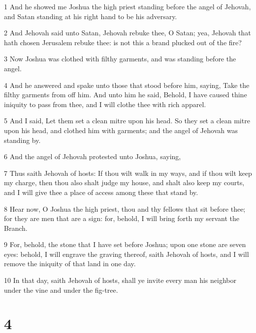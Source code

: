 \par 1 And he showed me Joshua the high priest standing before the angel of Jehovah, and Satan standing at his right hand to be his adversary.
\par 2 And Jehovah said unto Satan, Jehovah rebuke thee, O Satan; yea, Jehovah that hath chosen Jerusalem rebuke thee: is not this a brand plucked out of the fire?
\par 3 Now Joshua was clothed with filthy garments, and was standing before the angel.
\par 4 And he answered and spake unto those that stood before him, saying, Take the filthy garments from off him. And unto him he said, Behold, I have caused thine iniquity to pass from thee, and I will clothe thee with rich apparel.
\par 5 And I said, Let them set a clean mitre upon his head. So they set a clean mitre upon his head, and clothed him with garments; and the angel of Jehovah was standing by.
\par 6 And the angel of Jehovah protested unto Joshua, saying,
\par 7 Thus saith Jehovah of hosts: If thou wilt walk in my ways, and if thou wilt keep my charge, then thou also shalt judge my house, and shalt also keep my courts, and I will give thee a place of access among these that stand by.
\par 8 Hear now, O Joshua the high priest, thou and thy fellows that sit before thee; for they are men that are a sign: for, behold, I will bring forth my servant the Branch.
\par 9 For, behold, the stone that I have set before Joshua; upon one stone are seven eyes: behold, I will engrave the graving thereof, saith Jehovah of hosts, and I will remove the iniquity of that land in one day.
\par 10 In that day, saith Jehovah of hosts, shall ye invite every man his neighbor under the vine and under the fig-tree.

\chapter{4}


